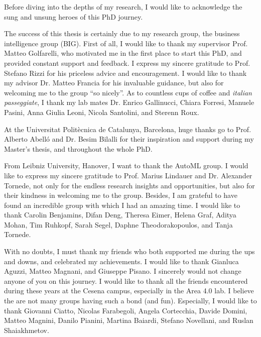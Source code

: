 \begin{acknowledgements}

Before diving into the depths of my research, I would like to acknowledge the sung and unsung heroes of this PhD journey.

\vspace{0.2cm}

The success of this thesis is certainly due to my research group, the business intelligence group (BIG).
First of all, I would like to thank my supervisor Prof. Matteo Golfarelli, who motivated me in the first place to start this PhD, and provided constant support and feedback.
I express my sincere gratitude to Prof. Stefano Rizzi for his priceless advice and encouragement.
I would like to thank my advisor Dr. Matteo Francia for his invaluable guidance, but also for welcoming me to the group ``so nicely''.
As to countless cups of coffee and \emph{italian passeggiate}, I thank my lab mates Dr. Enrico Gallinucci, Chiara Forresi, Manuele Pasini, Anna Giulia Leoni, Nicola Santolini, and Sterenn Roux.

\noindent At the Universitat Polit\`{e}cnica de Catalunya, Barcelona, huge thanks go to Prof. Alberto Abelló and Dr. Besim Bilalli for their inspiration and support during my Master's thesis, and throughout the whole PhD.

\noindent From Leibniz University, Hanover, I want to thank the AutoML group.
I would like to express my sincere gratitude to Prof. Marius Lindauer and Dr. Alexander Tornede, not only for the endless research insights and opportunities, but also for their kindness in welcoming me to the group.
Besides, I am grateful to have found an incredible group with which I had an amazing time.
I would like to thank Carolin Benjamins, Difan Deng, Theresa Eimer, Helena Graf, Aditya Mohan, Tim Ruhkopf, Sarah Segel, Daphne Theodorakopoulos, and Tanja Tornede.

\vspace{0.2cm}

With no doubts, I must thank my friends who both supported me during the ups and downs, and celebrated my achievements.
I would like to thank Gianluca Aguzzi,  Matteo Magnani, and Giuseppe Pisano.
I sincerely would not change anyone of you on this journey.
I would like to thank all the friends encountered during these years at the Cesena campus, especially in the Area 4.0 lab.
I believe the are not many groups having such a bond (and fun).
Especially, I would like to thank Giovanni Ciatto, Nicolas Farabegoli, Angela Cortecchia, Davide Domini, Matteo Magnini, Danilo Pianini, Martina Baiardi, Stefano Novellani, and Ruslan Shaiakhmetov.


\end{acknowledgements}
